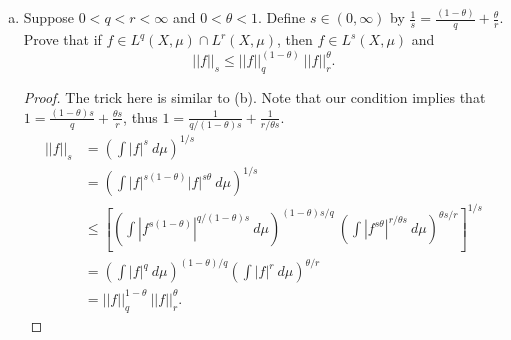\begin{itemize}
\begin{enumerate}[(a)]
\item Suppose $0 < q < r < \infty$ and $0 < \theta < 1$. Define $s \in (0,\infty)$ by $\frac{1}{s} = \frac{(1 - \theta)}{q} + \frac{\theta}{r}$. Prove that if $f \in L^q(X,\mu) \cap L^r(X,\mu)$, then $f \in L^s(X,\mu)$ and 
$$||f||_s \leq ||f||_q^{(1 - \theta)} \ ||f||_r^{\theta}.$$
\begin{proof}
The trick here is similar to (b). Note that our condition implies that $1 = \frac{(1 - \theta)s}{q} + \frac{\theta s}{r}$, thus $1 = \frac{1}{q/(1 - \theta)s} + \frac{1}{r/\theta s}$. 
\begin{align*}
    ||f||_s &= \left( \int |f|^s \ d\mu \right)^{1/s} \\
    &= \left( \int |f|^{s(1-\theta)} |f|^{s\theta} \ d\mu \right)^{1/s} \\
    &\leq \left[ \left( \int |f^{s(1-\theta)}|^{q/(1 - \theta)s} \ d\mu \right)^{(1 - \theta)s/q} \ \left( \int |f^{s\theta}|^{r/\theta s} \ d\mu \right)^{\theta s/r} \right]^{1/s} \\
    &= \left( \int |f|^q \ d\mu \right)^{(1 - \theta)/q} \left( \int |f|^r \ d\mu \right)^{\theta/r} \\
    &= ||f||_q^{1 - \theta} \ ||f||_r^{\theta}.
\end{align*}
\end{proof}
\end{enumerate}








\end{itemize}
